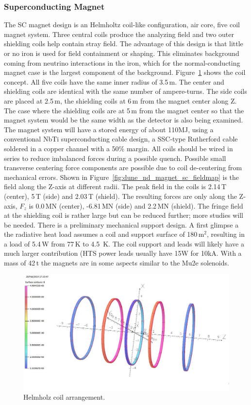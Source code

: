 \subsubsection{Superconducting %
Magnet}
\label{ssec:SCmagnet}
%
The SC magnet design is an Helmholtz coil-like configuration, air core,  five coil magnet system. Three central coils produce the analyzing field and two outer shielding coils help contain stray field. The advantage of this design is that little or no iron is used for field containment or shaping. This eliminates background coming from neutrino interactions in the iron, which for the normal-conducting magnet case is the largest component of the background. Figure~\ref{fig:dune_nd_magnet_sc_layout} shows the coil concept. All five coils have the same inner radius of 3.5\,m. The center and shielding coils are identical with the same number of ampere-turns. The side coils are placed at 2.5\,m, the shielding coils at 6\,m from the magnet center along Z.  The case where the shielding coils are at 5\,m from the magnet center so that the magnet system would be the same width as the  detector is also being examined.  The magnet system will have a stored energy of about 110MJ, using a conventional NbTi superconducting cable design, a SSC-type Rutherford cable soldered in a copper channel with a 50\% margin. All coils should be wired in series to reduce imbalanced forces during a possible quench. Possible small transverse centering force components are possible due to coil de-centering from mechanical errors. 
%
Shown in Figure~\ref{fig:dune_nd_magnet_sc_fieldmap} is the field along the Z-axis at different radii. The peak field in the coils is 2.14\,T (center), 5\,T (side) and 2.03\,T (shield). The resulting forces are only along the Z-axis, $F_{z}$ is 0.0\,MN (center), -6.81\,MN (side) and 2.2\,MN (shield). The fringe field at the shielding coil is rather large but can be reduced further; more studies will be needed. There is a preliminary mechanical support design. A first glimpse a the radiative heat load assumes a coil and support surface of 180\,m$^{2}$, resulting in a load of 5.4\,W from 77\,K to 4.5\, K. The coil support and leads will likely have a much larger contribution (HTS power leads usually have 15W for 10kA. With a mass of 42\,t the magnets are in some aspects similar to the Mu2e solenoids.
%
\begin{figure}[h] 
\centering
\includegraphics[width=0.95\columnwidth]{graphics/dune_nd_magnet_sc_layout.png} 
\caption{Helmholz coil arrangement.} 
\label{fig:dune_nd_magnet_sc_layout} 
\end{figure}
